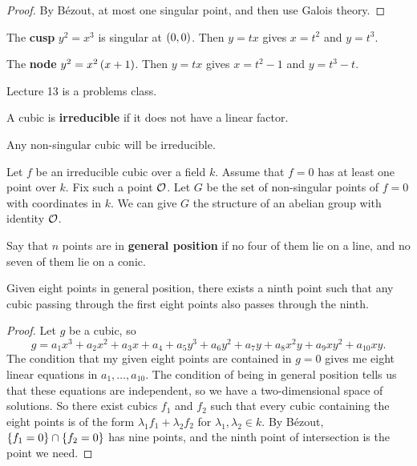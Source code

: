 \begin{proof}
By B\'ezout, at most one singular point, and then use Galois theory.
\end{proof}

\begin{example}
\label{eg:6.5}
The \textbf{cusp} $ y^2 = x^3 $ is singular at $ \br{0, 0} $. Then $ y = tx $ gives $ x = t^2 $ and $ y = t^3 $.
\end{example}

\begin{example}
The \textbf{node} $ y^2 = x^2\br{x + 1} $. Then $ y = tx $ gives $ x = t^2 - 1 $ and $ y = t^3 - t $.
\end{example}


Lecture 13 is a problems class.

\pagebreak


A cubic is \textbf{irreducible} if it does not have a linear factor.

\begin{example*}
Any non-singular cubic will be irreducible.
\end{example*}

\begin{theorem}
\label{thm:6.7}
Let $ f $ be an irreducible cubic over a field $ k $. Assume that $ f = 0 $ has at least one point over $ k $. Fix such a point $ \mathcal{O} $. Let $ G $ be the set of non-singular points of $ f = 0 $ with coordinates in $ k $. We can give $ G $ the structure of an abelian group with identity $ \mathcal{O} $.
\end{theorem}

Say that $ n $ points are in \textbf{general position} if no four of them lie on a line, and no seven of them lie on a conic.

\begin{lemma}
\label{lem:6.8}
Given eight points in general position, there exists a ninth point such that any cubic passing through the first eight points also passes through the ninth.
\end{lemma}

\begin{proof}
Let $ g $ be a cubic, so
$$ g = a_1x^3 + a_2x^2 + a_3x + a_4 + a_5y^3 + a_6y^2 + a_7y + a_8x^2y + a_9xy^2 + a_{10}xy. $$
The condition that my given eight points are contained in $ g = 0 $ gives me eight linear equations in $ a_1, \dots, a_{10} $. The condition of being in general position tells us that these equations are independent, so we have a two-dimensional space of solutions. So there exist cubics $ f_1 $ and $ f_2 $ such that every cubic containing the eight points is of the form $ \lambda_1f_1 + \lambda_2f_2 $ for $ \lambda_1, \lambda_2 \in k $. By B\'ezout, $ \cbr{f_1 = 0} \cap \cbr{f_2 = 0} $ has nine points, and the ninth point of intersection is the point we need.
\end{proof}

